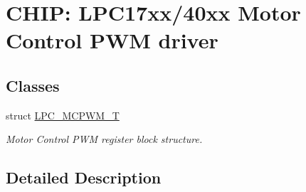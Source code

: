 \hypertarget{group__MCPWM__17XX__40XX}{}\section{C\+H\+IP\+: L\+P\+C17xx/40xx Motor Control P\+WM driver}
\label{group__MCPWM__17XX__40XX}
\subsection*{Classes}
\begin{DoxyCompactItemize}
\item 
struct \hyperlink{structLPC__MCPWM__T}{L\+P\+C\+\_\+\+M\+C\+P\+W\+M\+\_\+T}
\begin{DoxyCompactList}\small\item\em Motor Control P\+WM register block structure. \end{DoxyCompactList}\end{DoxyCompactItemize}


\subsection{Detailed Description}
